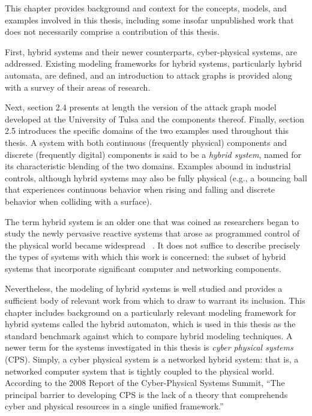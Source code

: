 This chapter provides background and context for the concepts, models, 
and examples involved in this thesis, including some insofar unpublished work
that does not necessarily comprise a contribution of this thesis. 

First, hybrid systems
and their newer counterparts, cyber-physical systems, are addressed. Existing
modeling frameworks for hybrid systems, particularly hybrid automata, are
defined, and an introduction to attack graphs is provided along with a
survey of their areas of research.

Next, section 2.4 presents at length the version of the attack graph model 
developed at the University of Tulsa and the components thereof. 
Finally, section 2.5 introduces the specific
domains of the two examples used throughout this thesis.
A system with both continuous (frequently physical) components and discrete (frequently digital)
components is said to be a \emph{hybrid system}, named for its characteristic blending of the
two domains. Examples abound in industrial controls,
although hybrid systems may also be fully physical (e.g., a bouncing ball that experiences continuous
behavior when rising and falling and discrete behavior when colliding with a surface).

The term hybrid system is an older one that was coined as researchers began to study the newly
pervasive reactive systems that arose as programmed control of the physical world became 
widespread ~\cite{alur1993hybrid}. It does not suffice to describe precisely
the types of systems with which this work is concerned: the subset of hybrid
systems that incorporate significant computer and networking components.

Nevertheless, the modeling of hybrid systems is well studied and provides a sufficient body
of relevant work from which to draw to warrant its inclusion. This chapter includes
background on a particularly relevant modeling framework for hybrid systems called the
hybrid automaton, which is used in this thesis as the standard benchmark against which to
compare hybrid modeling techniques.
A newer term for the systems investigated in this thesis is \emph{cyber physical systems}
 (CPS).
Simply, a cyber physical system is a networked hybrid system: that is, a 
networked computer system that is tightly coupled to the physical world.
According to the 2008 Report of the Cyber-Physical Systems Summit, ``The principal barrier to 
developing CPS is the lack of a theory that comprehends cyber and physical resources in a 
single unified framework.''~\cite{summitreport2008}

